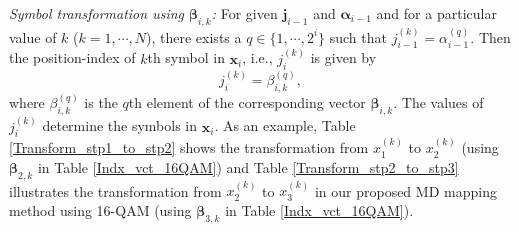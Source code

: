 \documentclass[12pt, draftclsnofoot, onecolumn]{IEEEtran}
\newcommand{\mb}[1]{\boldsymbol{#1}}
\newcommand{\thickhline}{\noalign{\hrule height 1.1pt}}
\begin{document}
\emph{Symbol transformation using $\mb{\beta}_{i,k}$:} For  given  $\mb{j}_{i-1}$ and $\mb{\alpha}_{i-1}$ and for a particular value of $k$ ($k = 1, \cdots, N$), there exists a $q \in \lbrace 1, \cdots, 2^{i}\rbrace$  such that 
$\label{beta_to_sym}
j^{(k)}_{i-1} = \alpha^{(q)}_{i-1}.$
Then the position-index of $k$th  symbol in  $\mb{x}_{i}$, i.e.,   $j^{(k)}_{i}$ is given by %
%
\begin{equation}
\label{beta_to_symbol}
j^{(k)}_{i} = \beta^{(q)}_{i,k},
\end{equation}
where $\beta^{(q)}_{i,k}$ is the $q$th element of the corresponding vector $\mb{\beta}_{i,k}$.   The values of $j^{(k)}_{i}$ determine the symbols in $\mb{x}_{i}$.   As an example,  Table  \ref{Transform_stp1_to_stp2} shows 
the transformation from $x_{1}^{(k)}$ to $x_{2}^{(k)}$ (using  $\mb{\beta}_{2,k}$  in     Table \ref{Indx_vct_16QAM}) and  Table \ref{Transform_stp2_to_stp3} illustrates the  transformation from $x_{2}^{(k)}$ to $x_{3}^{(k)}$ in   our  proposed MD mapping method using 16-QAM (using  $\mb{\beta}_{3,k}$  in     Table \ref{Indx_vct_16QAM}).
 

\end{document}
